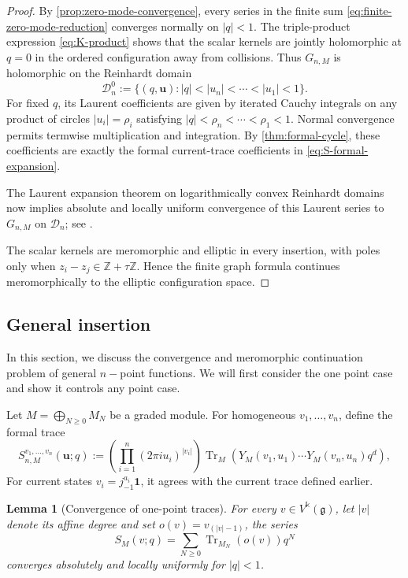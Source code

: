 \documentclass[11pt,a4paper]{amsart}
\numberwithin{equation}{section}
\newtheorem{lemma}[theorem]{Lemma}
\theoremstyle{definition}
\theoremstyle{remark}
\DeclareMathOperator{\Tr}{Tr}
\newcommand{\ZZ}{\mathbb Z}
\newcommand{\g}{\mathfrak g}
\newcommand{\kk}{\Bbbk}
\newcommand{\one}{\mathbf 1}
\newcommand{\ii}{i}
\newcommand{\scrD}{\mathscr D}
\newcommand{\ubf}{\boldsymbol u}
\begin{document}
\begin{proof}
By \cref{prop:zero-mode-convergence}, every series in the finite sum \eqref{eq:finite-zero-mode-reduction} converges normally on $|q|<1$.  The triple-product expression \eqref{eq:K-product} shows that the scalar kernels are jointly holomorphic at $q=0$ in the ordered configuration away from collisions.  Thus
$G_{n,M}$ is holomorphic on the Reinhardt domain 
\begin{equation*}
 \scrD_n^0:=
 \{(q,\ubf):|q|<|u_n|<\cdots<|u_1|<1\}.
\end{equation*}
For fixed $q$, its Laurent coefficients are given by iterated Cauchy integrals on any product of circles $|u_i|=\rho_i$ satisfying $|q|<\rho_n<\cdots<\rho_1<1$.  Normal convergence permits termwise multiplication and integration. By \cref{thm:formal-cycle}, these coefficients are exactly the formal current-trace coefficients in \eqref{eq:S-formal-expansion}.

The Laurent expansion theorem on logarithmically convex Reinhardt
domains now implies absolute and locally uniform convergence of this
Laurent series to $G_{n,M}$ on $\scrD_n$; see \cite[Section~1.5]{Scheidemann}.  

The scalar kernels are meromorphic and elliptic in every insertion, with
poles only when $z_i-z_j\in\ZZ+\tau\ZZ$.  Hence the finite graph formula
continues meromorphically to the elliptic configuration space. 

\end{proof}


\subsection{General insertion}
 In this section, we discuss the convergence and meromorphic continuation problem of general $n-$point functions. We will first consider the one point case and show it controls any point case.

Let $M=\bigoplus_{N\geq0}M_N$ be a graded module.  For homogeneous $v_1,\ldots,v_n$, define the formal trace
\begin{equation}
 S_{n,M}^{v_1,\ldots,v_n}(\ubf;q)
 :=\left(\prod_{i=1}^n(2\pi\ii u_i)^{|v_i|}\right)
 \Tr_M\!\left(Y_M(v_1,u_1)\cdots Y_M(v_n,u_n)q^d\right),
 \label{eq:general-insertion-trace}
\end{equation}
For current states $v_i=j_{-1}^{a_i}\one$, it agrees with the current trace defined earlier.

\begin{lemma}[Convergence of one-point traces]
\label{lem:arbitrary-affine-one-point}
For every $v\in V^{\kk}(\g)$, let $|v|$ denote its affine degree and set $o(v)=v_{(|v|-1)}$, the series
\begin{equation}
 S_M(v;q)
 =\sum_{N\geq0}
 \Tr_{M_N}\!\left(o(v)\right)q^N
 \label{eq:arbitrary-affine-one-point}
\end{equation}
converges absolutely and locally uniformly for $|q|<1$. 
\end{lemma}
\end{document}

